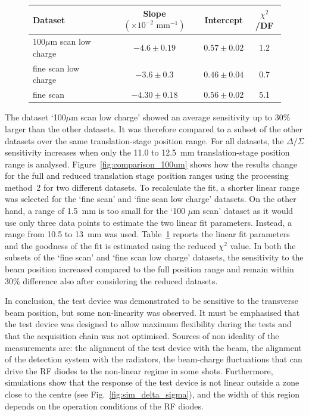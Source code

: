 \begin{figure}[!t]

  \centering
    \begin{tabular}{l c c c }
    \toprule
    Dataset & Slope $( \times 10^{-2} \text{ mm}^{-1})$ & Intercept  & $\chi^2$/DF \\
    \midrule
    $100\mu$m scan low charge    & $-4.6\pm0.19$ & $0.57\pm0.02$ &  1.2\\
    fine scan low charge & $-3.6\pm0.3$ & $0.46\pm0.04$ &  0.7\\
    fine scan          & $-4.30\pm0.18$ & $0.56\pm0.02$ &  5.1\\
    \bottomrule
    \end{tabular}
   \label{tab:fit_small_range}

\end{figure}

The dataset `100$\mu$m scan low charge' showed an average sensitivity up to 30\% larger than the other datasets. It was therefore compared to a subset of the other datasets over the same translation-stage position range. For all datasets, the $\Delta/\Sigma$ sensitivity increases when only the 11.0 to 12.5~mm translation-stage position range is analysed. Figure~\ref{fig:comparison_100um} shows how the results change for the full and reduced translation stage position ranges using the processing method~2 for two different datasets. To recalculate the fit, a shorter linear range was selected for the `fine scan' and `fine scan low charge' datasets. On the other hand, a range of 1.5~mm is too small for the `100 $\mu$m scan' dataset as it would use only three data points to estimate the two linear fit parameters. Instead, a range from 10.5 to 13~mm was used. Table~\ref{tab:fit_small_range} reports the linear fit parameters and the goodness of the fit is estimated using the reduced $\chi^2$ value. In both the subsets of the `fine scan' and `fine scan low charge'  datasets, the sensitivity to the beam position increased compared to the full position range and remain within 30\% difference also after considering the reduced datasets. 






In conclusion, the test device was demonstrated to be sensitive to the transverse beam position, but some non-linearity was observed. It must be emphasised that the test device was designed to allow maximum flexibility during the tests and that the acquisition chain was not optimised. Sources of non ideality of the measurements are: the alignment of the test device with the beam, the alignment of the detection system with the radiators, the beam-charge fluctuations that can drive the RF diodes to the non-linear regime in some shots. Furthermore, simulations show that the response of the test device is not linear outside a zone close to the centre (see Fig.~\ref{fig:sim_delta_sigma}), and the width of this region depends on the operation conditions of the RF diodes. 





